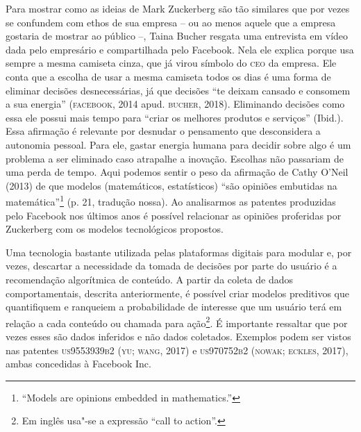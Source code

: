 Para mostrar como as ideias de Mark Zuckerberg são tão similares que por
vezes se confundem com ethos de sua empresa -- ou ao menos aquele que a
empresa gostaria de mostrar ao público --, Taina Bucher resgata uma
entrevista em vídeo dada pelo empresário e compartilhada pelo Facebook.
Nela ele explica porque usa sempre a mesma camiseta cinza, que já virou
símbolo do \textsc{ceo} da empresa. Ele conta que a escolha de usar a mesma
camiseta todos os dias é uma forma de eliminar decisões desnecessárias,
já que decisões ``te deixam cansado e consomem a sua energia''
(\textsc{facebook}, 2014 apud. \textsc{bucher}, 2018). Eliminando decisões como essa ele
possui mais tempo para ``criar os melhores produtos e serviços''
(Ibid.). Essa afirmação é relevante por desnudar o pensamento que
desconsidera a autonomia pessoal. Para ele, gastar energia humana para
decidir sobre algo é um problema a ser eliminado caso atrapalhe a
inovação. Escolhas não passariam de uma perda de tempo. Aqui podemos
sentir o peso da afirmação de Cathy O'Neil (2013) de que modelos
(matemáticos, estatísticos) ``são opiniões embutidas na
matemática''\footnote{``Models are opinions embedded in mathematics.''}
(p. 21, tradução nossa). Ao analisarmos as patentes produzidas pelo
Facebook nos últimos anos é possível relacionar as opiniões proferidas
por Zuckerberg com os modelos tecnológicos propostos.

Uma tecnologia bastante utilizada pelas plataformas digitais para
modular e, por vezes, descartar a necessidade da tomada de decisões por
parte do usuário é a recomendação algorítmica de conteúdo. A partir da
coleta de dados comportamentais, descrita anteriormente, é possível
criar modelos preditivos que quantifiquem e ranqueiem a probabilidade de
interesse que um usuário terá em relação a cada conteúdo ou chamada para
ação\footnote{Em inglês usa"-se a expressão ``call to action''.}. É
importante ressaltar que por vezes esses são dados inferidos e não dados
coletados. Exemplos podem ser vistos nas patentes \textsc{us9553939b2} (\textsc{yu; wang},
2017) e \textsc{us970752b2} (\textsc{nowak; eckles}, 2017), ambas concedidas à Facebook
Inc.

